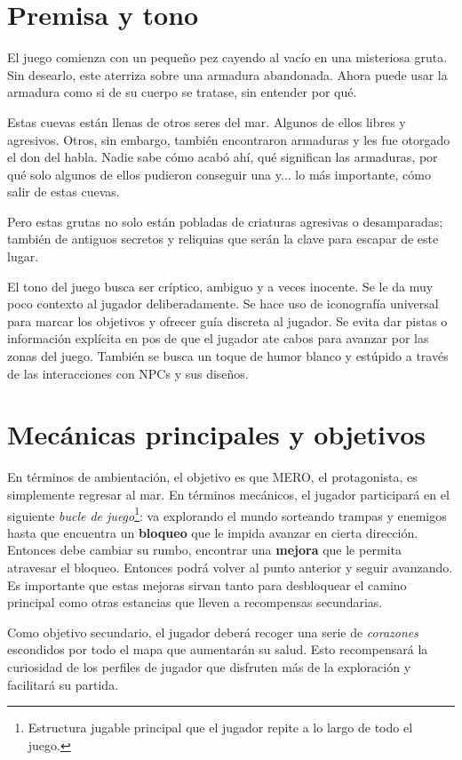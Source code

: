 \section{Premisa y tono}

El juego comienza con un pequeño pez cayendo al vacío en una misteriosa gruta. Sin desearlo, este aterriza sobre una armadura abandonada. Ahora puede usar la armadura como si de su cuerpo se tratase, sin entender por qué. 

Estas cuevas están llenas de otros seres del mar. Algunos de ellos libres y agresivos. Otros, sin embargo, también encontraron armaduras y les fue otorgado el don del habla. Nadie sabe cómo acabó ahí, qué significan las armaduras, por qué solo algunos de ellos pudieron conseguir una y... lo más importante, cómo salir de estas cuevas.

Pero estas grutas no solo están pobladas de criaturas agresivas o desamparadas; también de antiguos secretos y reliquias que serán la clave para escapar de este lugar.

El tono del juego busca ser críptico, ambiguo y a veces inocente. Se le da muy poco contexto al jugador deliberadamente. Se hace uso de iconografía universal para marcar los objetivos y ofrecer guía discreta al jugador. Se evita dar pistas o información explícita en pos de que el jugador ate cabos para avanzar por las zonas del juego. También se busca un toque de humor blanco y estúpido a través de las interacciones con NPCs y sus diseños.

\section{Mecánicas principales y objetivos}

En términos de ambientación, el objetivo es que MERO, el protagonista, es simplemente regresar al mar. En términos mecánicos, el jugador participará en el siguiente \textit{bucle de juego}\footnote{Estructura jugable principal que el jugador repite a lo largo de todo el juego.}: va explorando el mundo sorteando trampas y enemigos hasta que encuentra un \textbf{bloqueo} que le impida avanzar en cierta dirección. Entonces debe cambiar su rumbo, encontrar una \textbf{mejora} que le permita atravesar el bloqueo. Entonces podrá volver al punto anterior y seguir avanzando. Es importante que estas mejoras sirvan tanto para desbloquear el camino principal como otras estancias que lleven a recompensas secundarias.

Como objetivo secundario, el jugador deberá recoger una serie de \textit{corazones} escondidos por todo el mapa que aumentarán su salud. Esto recompensará la curiosidad de los perfiles de jugador que disfruten más de la exploración y facilitará su partida.

